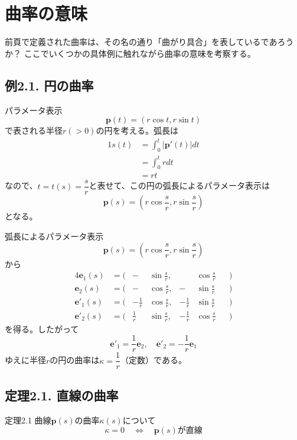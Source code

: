 \documentclass[a4j,disablejfam,dvipdfmx,papersize,slide,uplatex,21pt]{jsarticle}
\begin{document}
\section{曲率の意味}
前頁で定義された曲率は、その名の通り「曲がり具合」を表しているであろうか？
ここでいくつかの具体例に触れながら曲率の意味を考察する。

\newpage
\subsection*{例2.1. 円の曲率}
パラメータ表示
\begin{equation}
    \bm{p}(t) = (r \cos t, r \sin t)
\end{equation}
で表される半径$r (> 0)$の円を考える。弧長は
\begin{alignat}{1}
    s(t) &= \int_0^t |\bm{p}'(t)| dt \\
        &= \int_0^t r dt \\
        &= rt
\end{alignat}
なので、$t = t(s) = \dfrac{s}{r}$と表せて、この円の弧長によるパラメータ表示は
\begin{equation}
    \bm{p}(s) = \left(r \cos \frac{s}{r}, r \sin \frac{s}{r}\right)
\end{equation}
となる。

\newpage
弧長によるパラメータ表示
\begin{equation}
    \bm{p}(s) = \left(r \cos \frac{s}{r}, r \sin \frac{s}{r}\right)
\end{equation}
から
\begin{alignat}{4}
    \bm{e}_1(s) &=  \bigl(&- &\sin \frac{s}{r},& &\cos \frac{s}{r} &&\bigr) \\
    \bm{e}_2(s) &=  \bigl(&- &\cos \frac{s}{r},& -&\sin \frac{s}{r} &&\bigr) \\
    \bm{e}'_1(s) &= \bigl(&- \frac{1}{r} &\cos \frac{s}{r},& - \frac{1}{r} &\sin \frac{s}{r} &&\bigr) \\
    \bm{e}'_2(s) &= \bigl(&\frac{1}{r} &\sin \frac{s}{r},& - \frac{1}{r} &\cos \frac{s}{r} &&\bigr)
\end{alignat}
を得る。したがって
\begin{equation}
    \bm{e}'_1 = \frac{1}{r} \bm{e}_2,\quad
    \bm{e}'_2 = -\frac{1}{r} \bm{e}_1
\end{equation}
ゆえに半径$r$の円の曲率は$\kappa = \dfrac{1}{r}$（定数）である。

\newpage
\subsection*{定理2.1. 直線の曲率}
\begin{itembox}[l]{定理2.1}
    曲線$\bm{p}(s)$の曲率$\kappa(s)$について
    \begin{equation}
        \kappa = 0 \quad \Longleftrightarrow \quad \text{$\bm{p}(s)$が直線}
    \end{equation}
\end{itembox}
\end{document}

